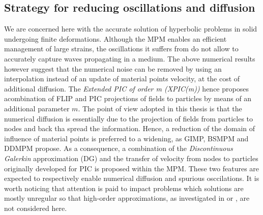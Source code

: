 \subsection{Strategy for reducing oscillations and diffusion}
We are concerned here with the accurate solution of hyperbolic problems in solid undergoing finite deformations. Although the MPM enables an efficient management of large strains, the oscillations it suffers from do not allow to accurately capture waves propagating in a medium. The above numerical results however suggest that the numerical noise can be removed by using an interpolation instead of an update of material points velocity, at the cost of additional diffusion. The \textit{Extended PIC of order m (XPIC(m))} \cite{XPIC} hence proposes acombination of FLIP and PIC projections of fields to particles by means of an additional parameter $m$.
The point of view adopted in this thesis is that the numerical diffusion is essentially due to the projection of fields from particles to nodes and back tha spread the information. Hence, a reduction of the domain of influence of material points is preferred to a widening, as GIMP, BSMPM and DDMPM propose. 
As a consequence, a combination of the  \textit{Discontinuous Galerkin} approximation (DG) and the transfer of velocity from nodes to particles originally developed for PIC is proposed within the MPM. These two features are expected to respectively enable numerical diffusion and spurious osccilations. It is worth noticing that attention is paid to impact problems which solutions are mostly unregular so that high-order approximations, as investigated in \cite{MPM_BSpline2} or \cite{BsplineMPM}, are not considered here. 


